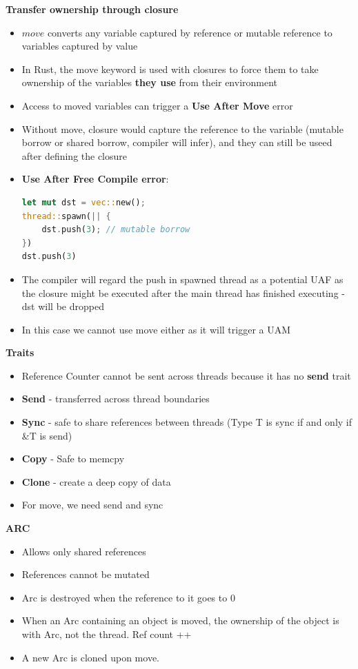 \documentclass[10pt, landscape]{article}
\begin{document}
\begin{multicols}{4}
\textbf{Transfer ownership through closure} \\ 
\begin{itemize}
    \item $move$ converts any variable captured by reference or mutable reference to variables captured by value 
    \item In Rust, the move keyword is used with closures to force them to take ownership of the variables \textbf{they use} from their environment
    \item Access to moved variables can trigger a \textbf{Use After Move} error
    \item Without move, closure would capture the reference to the variable (mutable borrow or shared borrow, compiler will infer), and they can still be useed after defining the closure
    \item \textbf{Use After Free Compile error}:
    \begin{lstlisting}[language=Rust, breaklines=true, breakatwhitespace=true]
let mut dst = vec::new();
thread::spawn(|| {
    dst.push(3); // mutable borrow
})
dst.push(3) 
    \end{lstlisting}
    \item The compiler will regard the push in spawned thread as a potential UAF as the closure might be executed after the main thread has finished executing - dst will be dropped
    \item In this case we cannot use move either as it will trigger a UAM 
\end{itemize}

\textbf{Traits} \\ 
\begin{itemize}
    \item Reference Counter cannot be sent across threads because it has no \textbf{send} trait 
    \item \textbf{Send} - transferred across thread boundaries 
    \item \textbf{Sync} - safe to share references between threads (Type T is sync if and only if \&T is send) 
    \item \textbf{Copy} - Safe to memcpy 
    \item \textbf{Clone} - create a deep copy of data 
    \item For move, we need send and sync 
\end{itemize}

\textbf{ARC} \\ 
\begin{itemize}
    \item Allows only shared references 
    \item References cannot be mutated
    \item Arc is destroyed when the reference to it goes to 0
    \item When an Arc containing an object is moved, the ownership of the object is with Arc, not the thread. Ref count ++
    \item A new Arc is cloned upon move.
\end{itemize}


\end{multicols}
\end{document}
